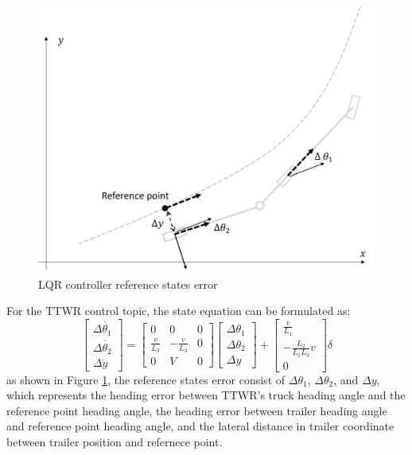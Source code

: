 \begin{figure}
    \centering
    \includegraphics[width=0.7\linewidth]{fig/lateral distance error.png}
    \caption{LQR controller reference states error}
    \label{fig: LQR controller reference states error}
\end{figure}

For the TTWR control topic, the state equation can be formulated as:
\begin{equation} 
\begin{bmatrix}
    \Delta \dot{\theta_1} \\ \Delta \dot{\theta_2} \\ \Delta \dot{y}
\end{bmatrix} = \begin{bmatrix}
0 & 0 & 0 \\
\frac{v}{L_3} & -\frac{v}{L_3} & 0 \\
0 & V & 0
\end{bmatrix}   \begin{bmatrix}
    \Delta \theta_1 \\ \Delta \theta_2 \\ \Delta y
\end{bmatrix} + \begin{bmatrix}
    \frac{v}{L_1} \\ -\frac{L_2}{L_1  L_3} v \\ 0
\end{bmatrix} \delta \label{eq: lqr state space}\end{equation}
as shown in Figure \ref{fig: LQR controller reference states error}, the reference states error consist of $\Delta \theta_1$, $\Delta \theta_2$, and $\Delta y$, which represents the heading error between TTWR's truck heading angle and the reference point heading angle, the heading error between trailer heading angle and reference point heading angle, and the lateral distance in trailer coordinate between trailer position and refernece point.

